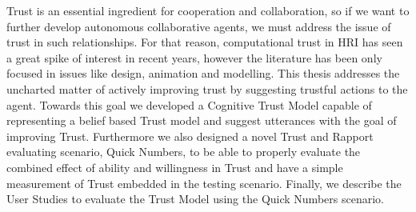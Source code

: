 \noindent  Trust is an essential ingredient for cooperation and collaboration, so if we want to further develop autonomous collaborative agents, we must address the issue of trust in such relationships. For that reason, computational trust in \ac{HRI} has seen a great spike of interest in recent years, however the literature has been only focused in issues like design, animation and modelling. This thesis addresses the uncharted matter of actively improving trust by suggesting trustful actions to the agent. Towards this goal we developed a Cognitive Trust Model capable of representing a belief based Trust model and suggest utterances with the goal of improving Trust. Furthermore we also designed a novel Trust and Rapport evaluating scenario, Quick Numbers, to be able to properly evaluate the combined effect of ability and willingness in Trust and have a simple measurement of Trust embedded in the testing scenario. Finally, we describe the User Studies to evaluate the Trust Model using the Quick Numbers scenario.